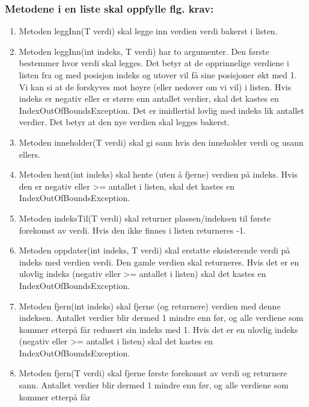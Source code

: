 \documentclass[11pt]{article}
\begin{document}
        \subsubsection{Metodene i en liste skal oppfylle flg. krav: }
            \begin{enumerate}
                \item Metoden leggInn(T verdi) skal legge inn verdien verdi bakerst i listen.
                \item Metoden leggInn(int indeks, T verdi) har to argumenter. Den første bestemmer
                hvor verdi skal legges. Det betyr at de opprinnelige verdiene i listen fra og med
                posisjon indeks og utover vil få sine posisjoner økt med 1. Vi kan si at de forskyves
                mot høyre (eller nedover om vi vil) i listen. Hvis indeks er negativ eller er større enn
                antallet verdier, skal det kastes en IndexOutOfBoundsException. Det er imidlertid lovlig
                med indeks lik antallet verdier. Det betyr at den nye verdien skal legges bakerst.
                \item Metoden inneholder(T verdi) skal gi sann hvis den inneholder verdi og usann ellers.
                \item Metoden hent(int indeks) skal hente (uten å fjerne) verdien på indeks. Hvis den er
                negativ eller >= antallet i listen, skal det kastes en IndexOutOfBoundsException.
                \item Metoden indeksTil(T verdi) skal returner plassen/indeksen til første forekomst av
                verdi. Hvis den ikke finnes i listen returneres -1.
                \item Metoden oppdater(int indeks, T verdi) skal erstatte eksisterende verdi på indeks
                med verdien verdi. Den gamle verdien skal returneres. Hvis det er en ulovlig indeks
                (negativ eller >= antallet i listen) skal det kastes en IndexOutOfBoundsException.
                \item Metoden fjern(int indeks) skal fjerne (og returnere) verdien med denne indeksen.
                Antallet verdier blir dermed 1 mindre enn før, og alle verdiene som kommer etterpå får
                redusert sin indeks med 1. Hvis det er en ulovlig indeks (negativ eller >= antallet i
                listen) skal det kastes en IndexOutOfBoundsException.
                \item Metoden fjern(T verdi) skal fjerne første forekomst av verdi og returnere sann.
                Antallet verdier blir dermed 1 mindre enn før, og alle verdiene som kommer etterpå får

\end{enumerate}
\end{document}
